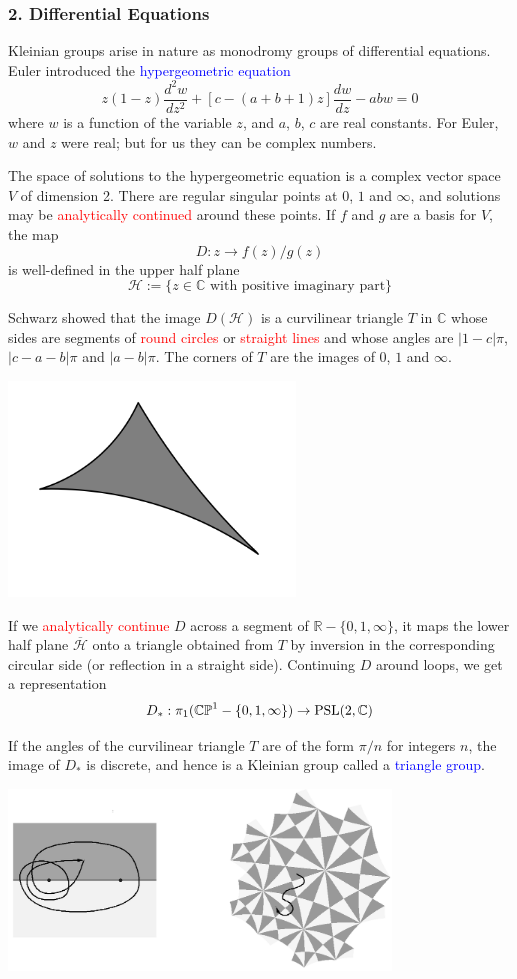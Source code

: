 \documentclass{beamer}
\def\R{\mathbb{R}}
\def\HH{\mathcal{H}}
\def\CP{\mathbb{CP}}
\def\C{\mathbb{C}}
\def\PSL{\textnormal{PSL}}
\begin{document}
\frame
{
\frametitle{2. Differential Equations}

Kleinian groups arise in nature as monodromy groups of \textcolor{dgreen}{differential equations}.
\vskip 5pt
Euler introduced the \textcolor{blue}{hypergeometric equation}
$$z(1-z)\frac {d^2w}{dz^2} + [c - (a+b+1)z]\frac {dw}{dz} - abw = 0$$
where $w$ is a function of the variable $z$, and $a$, $b$, $c$ are real constants.
\vskip 10pt
For Euler, $w$ and $z$ were real; but for us they can be complex numbers.
}
\frame
{The space of solutions to the hypergeometric equation
is a complex vector space $V$ of dimension 2. 
\vskip 10pt
There are \textcolor{dgreen}{regular singular points}
at $0$, $1$ and $\infty$, and solutions may be \textcolor{red}{analytically continued} 
around these points.
\vskip 10pt
If $f$ and $g$ are a basis for $V$, the map $$D:z \to f(z)/g(z)$$ is well-defined
in the \textcolor{dgreen}{upper half plane}
$$\HH:=\lbrace z \in \C \text{ with positive imaginary part} \rbrace$$
}
\frame
{
Schwarz showed that the image $D(\HH)$ is a \textcolor{dgreen}{curvilinear triangle} $T$ in $\C$
whose sides are segments of \textcolor{red}{round circles} or \textcolor{red}{straight lines}
and whose angles are $|1-c|\pi$, $|c-a-b|\pi$ and $|a-b|\pi$.
\vskip 10pt
The corners of $T$ are the images of $0$, $1$ and $\infty$.
\begin{center}
\includegraphics[width=3in]{Schwarz_triangle.png}
\end{center}
}
\frame
{
If we \textcolor{red}{analytically continue} $D$ across a segment of 
$\R - \lbrace 0,1,\infty\rbrace$, it maps
the lower half plane $\overline{\HH}$ onto a triangle obtained from $T$ by \textcolor{dgreen}{inversion}
in the corresponding circular side (or \textcolor{dgreen}{reflection} in a straight side).
\vskip 10pt
Continuing $D$ around loops, we get a
representation 
$$D_*:\pi_1(\CP^1 - \lbrace 0,1,\infty\rbrace) \to \PSL(2,\C)$$ 
}
\frame
{
If the angles of the curvilinear triangle $T$ are of the form $\pi/n$ for integers $n$, 
the image of $D_*$ is discrete, and hence is a Kleinian group
called a \textcolor{blue}{triangle group}.
\begin{center}
\includegraphics[width=4in]{triangle_group.png}
\end{center}
}
\end{document}
